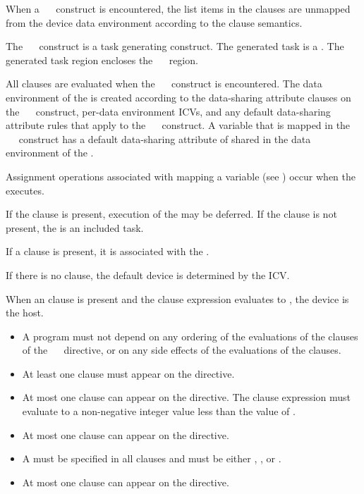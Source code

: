 \descr
When a ~~ construct is encountered, the list items in the  clauses are unmapped from the device data environment according to the  clause semantics.

The ~~ construct is a task generating construct.  The generated task is a .  The generated task region encloses the ~~ region.

All clauses are evaluated when the ~~ construct is encountered.  The data environment of the  is created according to the data-sharing attribute clauses on the ~~ construct, per-data environment ICVs, and any default data-sharing attribute rules that apply to the ~~ construct.  A variable that is mapped in the ~~ construct has a default data-sharing attribute of shared in the data environment of the .

Assignment operations associated with mapping a variable (see ) occur when the  executes.

If the  clause is present, execution of the  may be deferred.  If the  clause is not present, the  is an included task.

If a  clause is present, it is associated with the .

If there is no  clause, the default device is determined by the  ICV.

When an  clause is present and the  clause expression evaluates to , the device is the host.
{}

\restrictions
\begin{itemize}
\item A program must not depend on any ordering of the evaluations of the clauses of the ~~ directive, or on any side effects of the evaluations of the clauses.
\item At least one  clause must appear on the directive.
\item At most one  clause can appear on the
  directive.  The  clause expression must evaluate to a
  non-negative integer value less than the value of
  .
\item At most one  clause can appear on the directive.
\item A  must be specified in all  clauses and must be either , , or .
\item At most one  clause can appear on the directive.
\end{itemize}

